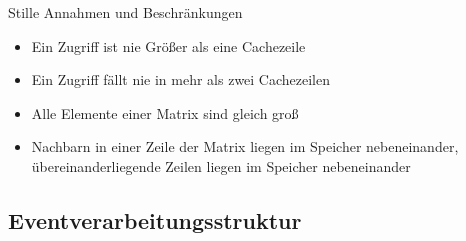 \begin{frame}
        \begin{block}{Stille Annahmen und Beschränkungen}
                \begin{itemize}
                        \pause \item Ein Zugriff ist nie Größer als eine Cachezeile
                               \item Ein Zugriff fällt nie in mehr als zwei Cachezeilen
                        \pause \item Alle Elemente einer Matrix sind gleich groß
                        \pause \item Nachbarn in einer Zeile der Matrix liegen im Speicher nebeneinander, übereinanderliegende Zeilen liegen im Speicher nebeneinander
                \end{itemize}
        \end{block}
\end{frame}

\subsection{Eventverarbeitungsstruktur} 
